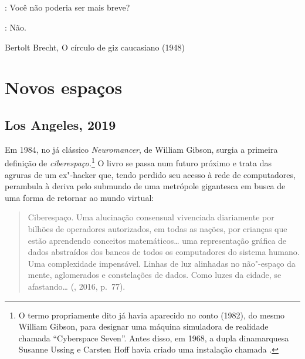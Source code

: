 \chapter*{}
\thispagestyle{empty}
\begin{vplace}[30]
: Você não poderia ser mais breve?

: Não.

Bertolt Brecht, O círculo de giz caucasiano (1948)
\end{vplace}

\part{Novos espaços}

\chapter{Los Angeles, 2019}

Em 1984, no já clássico \emph{Neuromancer}, de William Gibson, surgia a
primeira definição de \emph{ciberespaço.}\footnote{O termo propriamente
  dito já havia aparecido no conto {} (1982), do
  mesmo William Gibson, para designar uma máquina simuladora de
  realidade chamada ``Cyberspace Seven''. Antes disso, em 1968, a dupla
  dinamarquesa Susanne Ussing e Carsten Hoff havia criado uma
  instalação chamada {}.} O livro se passa num
futuro próximo e trata das agruras de um ex"-hacker que, tendo perdido
seu acesso à rede de computadores, perambula à deriva pelo submundo de
uma metrópole gigantesca em busca de uma forma de retornar ao mundo
virtual:

\begin{quote}
Ciberespaço. Uma alucinação consensual vivenciada diariamente por
bilhões de operadores autorizados, em todas as nações, por crianças que
estão aprendendo conceitos matemáticos\ldots{} uma representação gráfica de
dados abstraídos dos bancos de todos os computadores do sistema humano.
Uma complexidade impensável. Linhas de luz alinhadas no não"-espaço da
mente, aglomerados e constelações de dados. Como luzes da cidade, se
afastando\ldots{} (, 2016, p.~77).
\end{quote}

